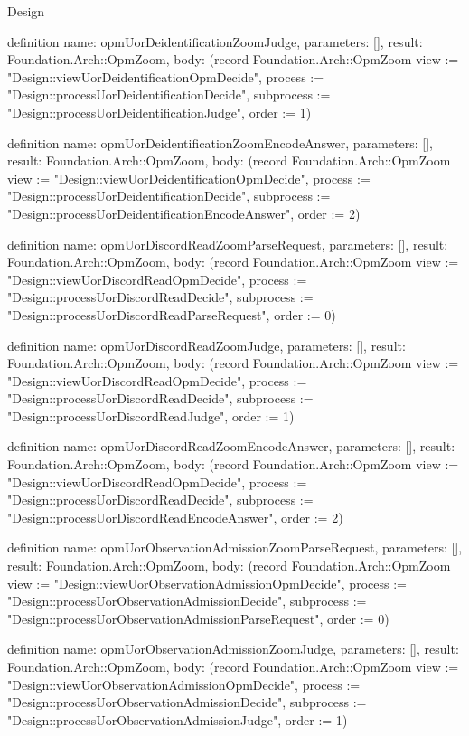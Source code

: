 \begin{lexlean}{Design}
\begin{semanticmodule}
definition{
  name: opmUorDeidentificationZoomJudge,
  parameters: [],
  result: Foundation.Arch::OpmZoom,
  body: (record Foundation.Arch::OpmZoom {view := "Design::viewUorDeidentificationOpmDecide", process := "Design::processUorDeidentificationDecide", subprocess := "Design::processUorDeidentificationJudge", order := 1})
}

definition{
  name: opmUorDeidentificationZoomEncodeAnswer,
  parameters: [],
  result: Foundation.Arch::OpmZoom,
  body: (record Foundation.Arch::OpmZoom {view := "Design::viewUorDeidentificationOpmDecide", process := "Design::processUorDeidentificationDecide", subprocess := "Design::processUorDeidentificationEncodeAnswer", order := 2})
}

definition{
  name: opmUorDiscordReadZoomParseRequest,
  parameters: [],
  result: Foundation.Arch::OpmZoom,
  body: (record Foundation.Arch::OpmZoom {view := "Design::viewUorDiscordReadOpmDecide", process := "Design::processUorDiscordReadDecide", subprocess := "Design::processUorDiscordReadParseRequest", order := 0})
}

definition{
  name: opmUorDiscordReadZoomJudge,
  parameters: [],
  result: Foundation.Arch::OpmZoom,
  body: (record Foundation.Arch::OpmZoom {view := "Design::viewUorDiscordReadOpmDecide", process := "Design::processUorDiscordReadDecide", subprocess := "Design::processUorDiscordReadJudge", order := 1})
}

definition{
  name: opmUorDiscordReadZoomEncodeAnswer,
  parameters: [],
  result: Foundation.Arch::OpmZoom,
  body: (record Foundation.Arch::OpmZoom {view := "Design::viewUorDiscordReadOpmDecide", process := "Design::processUorDiscordReadDecide", subprocess := "Design::processUorDiscordReadEncodeAnswer", order := 2})
}

definition{
  name: opmUorObservationAdmissionZoomParseRequest,
  parameters: [],
  result: Foundation.Arch::OpmZoom,
  body: (record Foundation.Arch::OpmZoom {view := "Design::viewUorObservationAdmissionOpmDecide", process := "Design::processUorObservationAdmissionDecide", subprocess := "Design::processUorObservationAdmissionParseRequest", order := 0})
}

definition{
  name: opmUorObservationAdmissionZoomJudge,
  parameters: [],
  result: Foundation.Arch::OpmZoom,
  body: (record Foundation.Arch::OpmZoom {view := "Design::viewUorObservationAdmissionOpmDecide", process := "Design::processUorObservationAdmissionDecide", subprocess := "Design::processUorObservationAdmissionJudge", order := 1})
}


\end{semanticmodule}
\end{lexlean}
